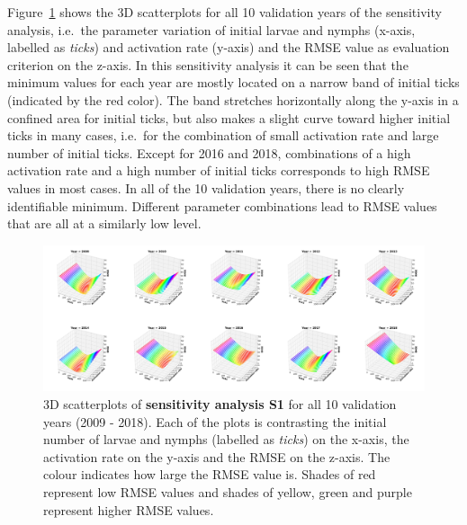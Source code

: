 \documentclass[a4paper, 11pt]{scrartcl}
\begin{document}
Figure~\ref{fig:S1_2009_2018_rmse} shows the 3D scatterplots for all 10 validation years of the sensitivity analysis, i.e.\ the parameter variation of initial
larvae and nymphs (x-axis, labelled as \textit{ticks}) and activation rate (y-axis) and the RMSE value as evaluation criterion on the z-axis. In this sensitivity analysis it can be seen that the minimum values for each year are mostly located on a narrow band of initial ticks (indicated by the red color). The band stretches horizontally along the y-axis in a confined area for initial ticks, but also makes a slight curve toward higher initial ticks in many cases, i.e.\ for the combination of small activation rate and large number of initial ticks. Except for 2016 and 2018, combinations of a high activation rate and a high number of initial ticks corresponds to high RMSE values in most cases. In all of the 10 validation years, there is no clearly identifiable minimum. Different parameter combinations lead to RMSE values that are all at a similarly low level.

\begin{figure}[h!]
\centering
\includegraphics[width=\linewidth]{figures/S1_2009_2018_rmse}
\caption{3D scatterplots of \textbf{sensitivity analysis S1} for all 10 validation years (2009 - 2018). Each of the plots is contrasting the initial number of larvae and nymphs (labelled as \textit{ticks}) on the x-axis, the activation rate on the y-axis and the RMSE on the z-axis. The colour indicates how large the RMSE value is. Shades of red represent low RMSE values and shades of yellow, green and purple represent higher RMSE values.}
\label{fig:S1_2009_2018_rmse}
\end{figure}
\end{document}

